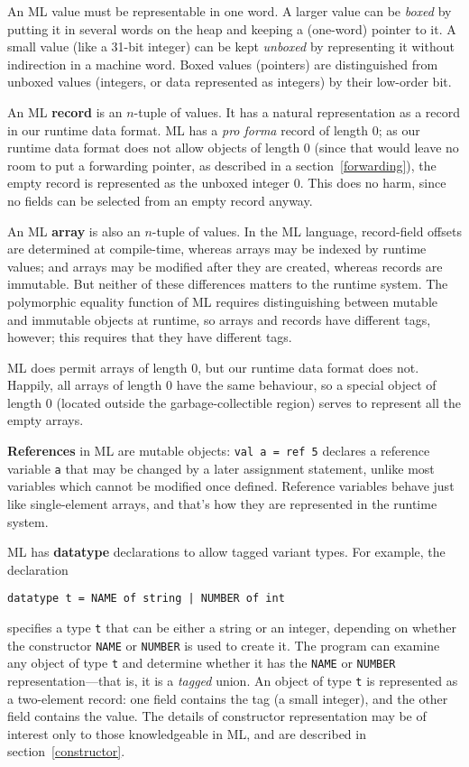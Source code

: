 An ML value must be representable in one word.  A larger value can be {\em
boxed} by putting it in several words on the heap and keeping a (one-word)
pointer to it.  A small value (like a 31-bit integer)
can be kept {\em unboxed} by representing it without indirection in
a machine word.
Boxed
values (pointers)
are distinguished from unboxed values (integers, or data represented as
integers)
by their low-order bit.

An ML {\bf record}
is an $n$-tuple of values.  It has a natural representation
as a record in our runtime data format.  ML has a {\it pro forma}
record of length 0; as our runtime data format does not allow objects of length
0 (since that would leave no room to put a forwarding pointer, as described in
a section~\ref{forwarding}),
the empty record
is represented as the unboxed integer 0.  This does no harm, since
no fields can be selected from an empty record anyway.

An ML {\bf array} is also an $n$-tuple of values.
In the ML language, 
record-field offsets are determined at compile-time, whereas
arrays may be indexed by runtime values;
and arrays may be modified after
they are created, whereas records are immutable.
But neither of these
differences matters to the runtime system.
The polymorphic equality function of ML requires distinguishing between
mutable and immutable objects at runtime, so arrays and records
have different tags, however; this requires that they have different
tags.

ML does permit 
arrays of length 0,
but our runtime data format does not.
Happily, all arrays of length 0 have
the same behaviour, so a special object of length 0 (located outside
the garbage-collectible region) serves to represent all the
empty arrays.

{\bf References} in ML are mutable objects:  
\verb"val a = ref 5" declares a reference
variable \verb"a" that may be
changed by a later assignment statement, unlike most variables which cannot
be modified once defined.  Reference variables behave just like single-element
arrays, and that's how they are represented in the runtime system.

ML has {\bf datatype}
declarations to allow tagged variant types.  For example,
the declaration
\begin{verbatim}
datatype t = NAME of string | NUMBER of int
\end{verbatim}
specifies a type \verb"t" that can be either a string or an integer,
depending on whether the constructor \verb"NAME"
or \verb"NUMBER" is used to create it.
The program can examine any object of type \verb"t" and determine whether
it has the \verb"NAME" or \verb"NUMBER" representation---that is, it
is a {\em tagged} union.  An object of type \verb"t" is represented
as a two-element record: one field contains the tag (a small integer),
and the other field contains the value.
The details of constructor representation may be of interest
only to those knowledgeable in ML, and are described in 
section~\ref{constructor}.

